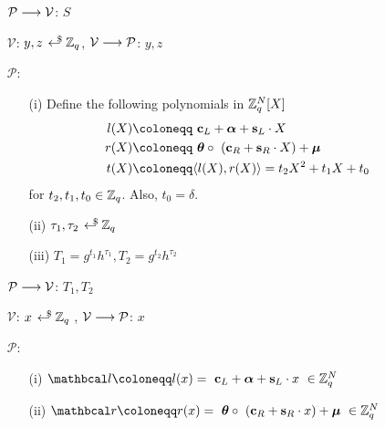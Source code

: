 \begin{mdframed}
\begin{itemize}[itemsep=4pt]
    \item[] $\mathcal{P} \longrightarrow \V$: $S$
    
    \item[] $\mathcal{V}$: $y, z \rgen \Z_q$, $\mathcal{V} \longrightarrow \P$: $y, z$
    
    
    \item[] $\mathcal{P}$:
    \begin{enumerate}[itemsep=5pt]
      \item[(i)] Define the following polynomials in $\Z^{N}_q[X]$
      \begin{align*}
          l(X) &\coloneqq \ \cL + \boldsymbol{\alpha} + \textbf{s}_L \cdot X \\
          r(X) &\coloneqq \ \vecnb{\theta} \circ \ (\cR + \textbf{s}_R \cdot X) + \vecnb{\mu}\\
          t(X) &\coloneqq \langle l(X),r(X) \rangle = t_2 X^2 + t_1 X + t_0
      \end{align*}
      for $t_2, t_1, t_0 \in \Z_q$. Also, $t_0 = \delta$.
        
      \item[(ii)] $\tau_1, \tau_2 \rgen \Z_q$ 
      
      \item[(iii)] $T_1 = g^{t_1}h^{\tau_1}, T_2 = g^{t_2}h^{\tau_2}$ 
    \end{enumerate}
        
    \item[] $\mathcal{P} \longrightarrow \V$: $T_1, T_2$
  
    \item[] $\mathcal{V}$: $x \rgen \Z_q$ , $\mathcal{V} \longrightarrow \P$: $x$


    \item[] $\mathcal{P}$: 
    \begin{enumerate}[itemsep=5pt]
        \item[(i)] $\lvec \coloneqq l(x) = \ \cL + \vecnb{\alpha} + \textbf{s}_L \cdot x \ \in \Z_q^N$
        
        \item[(ii)] $\rvec \coloneqq r(x) = \ \vecnb{\theta} \circ \ (\cR + \textbf{s}_R \cdot x) + \vecnb{\mu} \ \in \Z^N_q$
        

\end{enumerate}
\end{itemize}
\end{mdframed}
